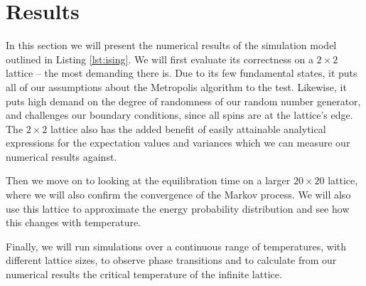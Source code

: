 \documentclass[]{article}
\begin{document}





\section{Results} \label{sec:results}

In this section we will present the numerical results of the simulation model outlined in Listing \ref{lst:ising}. We will first evaluate its correctness on a $2 \times 2$ lattice -- the most demanding there is. Due to its few fundamental states, it puts all of our assumptions about the Metropolis algorithm to the test. Likewise, it puts high demand on the degree of randomness of our random number generator, and challenges our boundary conditions, since all spins are at the lattice's edge. The $2 \times 2$ lattice also has the added benefit of easily attainable analytical expressions for the expectation values and variances which we can measure our numerical results against.

Then we move on to looking at the equilibration time on a larger $20 \times 20$ lattice, where we will also confirm the convergence of the Markov process. We will also use this lattice to approximate the energy probability distribution and see how this changes with temperature. 

Finally, we will run simulations over a continuous range of temperatures, with different lattice sizes, to observe phase transitions and to calculate from our numerical results the critical temperature of the infinite lattice.
\end{document}
